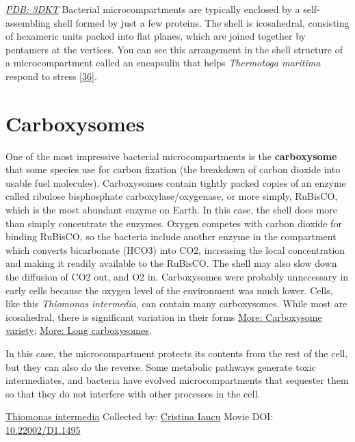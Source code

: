 \documentclass[]{tufte-book}
\begin{document}
\href{http://rcsb.org/structure/3DKT}{\emph{PDB: 3DKT}}
Bacterial microcompartments are typically enclosed by a self-assembling shell formed by just a few proteins. The shell is icosahedral, consisting of hexameric units packed into flat planes, which are joined together by pentamers at the vertices. You can see this arrangement in the shell structure of a microcompartment called an encapsulin that helps \emph{Thermotoga maritima} respond to stress {[}\protect\hyperlink{ref-sutter2008}{36}{]}.

\hypertarget{carboxysomes}{%
\section{Carboxysomes}\label{carboxysomes}}

One of the most impressive bacterial microcompartments is the \textbf{carboxysome} that some species use for carbon fixation (the breakdown of carbon dioxide into usable fuel molecules). Carboxysomes contain tightly packed copies of an enzyme called ribulose bisphosphate carboxylase/oxygenase, or more simply, RuBisCO, which is the most abundant enzyme on Earth. In this case, the shell does more than simply concentrate the enzymes. Oxygen competes with carbon dioxide for binding RuBisCO, so the bacteria include another enzyme in the compartment which converts bicarbonate (HCO3) into CO2, increasing the local concentration and making it readily available to the RuBisCO. The shell may also slow down the diffusion of CO2 out, and O2 in. Carboxysomes were probably unnecessary in early cells because the oxygen level of the environment was much lower. Cells, like this \emph{Thiomonas intermedia}, can contain many carboxysomes. While most are icosahedral, there is significant variation in their forms \protect\hyperlink{Carboxysome_variety}{More: Carboxysome variety}; \protect\hyperlink{Long_carboxysomes}{More: Long carboxysomes}.

In this case, the microcompartment protects its contents from the rest of the cell, but they can also do the reverse. Some metabolic pathways generate toxic intermediates, and bacteria have evolved microcompartments that sequester them so that they do not interfere with other processes in the cell.



\hypertarget{htmlwidget-15e41cce37b6fa249a5f}{}

\label{fig:4-7}\protect\hyperlink{tree}{Thiomonas intermedia} Collected by: \protect\hyperlink{cristina_iancu}{Cristina Iancu} Movie DOI: \href{https://doi.org/10.22002/D1.1495}{10.22002/D1.1495}
\end{document}

